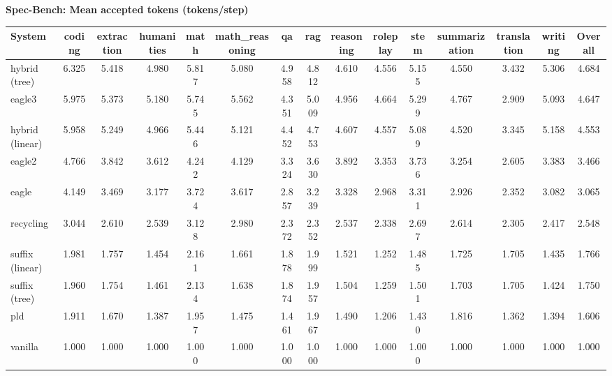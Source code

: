 \textbf{Spec-Bench: Mean accepted tokens (tokens/step)}
\begin{table}[H]
\begin{adjustbox}{width=\linewidth}
\centering
\begin{tabular}{lcccccccccccccc}
\toprule
\textbf{System} & coding & extraction & humanities & math & math\_reasoning & qa & rag & reasoning & roleplay & stem & summarization & translation & writing & \textbf{Overall} \\
\midrule
hybrid (tree) & 6.325 & 5.418 & 4.980 & 5.817 & 5.080 & 4.958 & 4.812 & 4.610 & 4.556 & 5.155 & 4.550 & 3.432 & 5.306 & 4.684 \\
eagle3 & 5.975 & 5.373 & 5.180 & 5.745 & 5.562 & 4.351 & 5.009 & 4.956 & 4.664 & 5.299 & 4.767 & 2.909 & 5.093 & 4.647 \\
hybrid (linear) & 5.958 & 5.249 & 4.966 & 5.446 & 5.121 & 4.452 & 4.753 & 4.607 & 4.557 & 5.089 & 4.520 & 3.345 & 5.158 & 4.553 \\
eagle2 & 4.766 & 3.842 & 3.612 & 4.242 & 4.129 & 3.324 & 3.630 & 3.892 & 3.353 & 3.736 & 3.254 & 2.605 & 3.383 & 3.466 \\
eagle & 4.149 & 3.469 & 3.177 & 3.724 & 3.617 & 2.857 & 3.239 & 3.328 & 2.968 & 3.311 & 2.926 & 2.352 & 3.082 & 3.065 \\
recycling & 3.044 & 2.610 & 2.539 & 3.128 & 2.980 & 2.372 & 2.352 & 2.537 & 2.338 & 2.697 & 2.614 & 2.305 & 2.417 & 2.548 \\
suffix (linear) & 1.981 & 1.757 & 1.454 & 2.161 & 1.661 & 1.878 & 1.999 & 1.521 & 1.252 & 1.485 & 1.725 & 1.705 & 1.435 & 1.766 \\
suffix (tree) & 1.960 & 1.754 & 1.461 & 2.134 & 1.638 & 1.874 & 1.957 & 1.504 & 1.259 & 1.501 & 1.703 & 1.705 & 1.424 & 1.750 \\
pld & 1.911 & 1.670 & 1.387 & 1.957 & 1.475 & 1.461 & 1.967 & 1.490 & 1.206 & 1.430 & 1.816 & 1.362 & 1.394 & 1.606 \\
vanilla & 1.000 & 1.000 & 1.000 & 1.000 & 1.000 & 1.000 & 1.000 & 1.000 & 1.000 & 1.000 & 1.000 & 1.000 & 1.000 & 1.000 \\
\bottomrule
\end{tabular}
\end{adjustbox}
\end{table}

